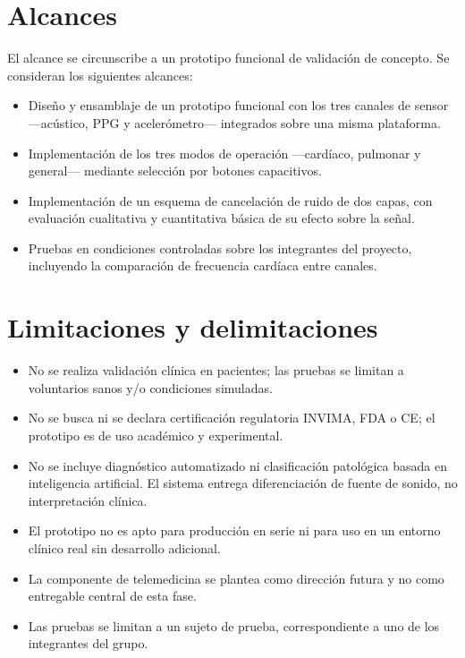 \section{Alcances}\label{alcances}

El alcance se circunscribe a un prototipo funcional de validación de concepto. Se consideran los siguientes alcances:

\begin{itemize}
    \item Diseño y ensamblaje de un prototipo funcional con los tres canales de sensor ---acústico, PPG y acelerómetro--- integrados sobre una misma plataforma.
    \item Implementación de los tres modos de operación ---cardíaco, pulmonar y general--- mediante selección por botones capacitivos.
    \item Implementación de un esquema de cancelación de ruido de dos capas, con evaluación cualitativa y cuantitativa básica de su efecto sobre la señal.
    \item Pruebas en condiciones controladas sobre los integrantes del proyecto, incluyendo la comparación de frecuencia cardíaca entre canales.
\end{itemize}

\section{Limitaciones y delimitaciones}\label{LimDelim}

\begin{itemize}
    \item No se realiza validación clínica en pacientes; las pruebas se limitan a voluntarios sanos y/o condiciones simuladas.
    \item No se busca ni se declara certificación regulatoria INVIMA, FDA o CE; el prototipo es de uso académico y experimental.
    \item No se incluye diagnóstico automatizado ni clasificación patológica basada en inteligencia artificial. El sistema entrega diferenciación de fuente de sonido, no interpretación clínica.
    \item El prototipo no es apto para producción en serie ni para uso en un entorno clínico real sin desarrollo adicional.
    \item La componente de telemedicina se plantea como dirección futura y no como entregable central de esta fase.
    \item Las pruebas se limitan a un sujeto de prueba, correspondiente a uno de los integrantes del grupo.
\end{itemize}

